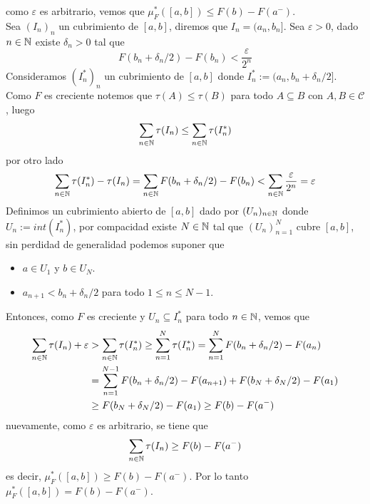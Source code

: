 \documentclass{article}
\begin{document}
\begin{enumerate}
    como $\varepsilon$ es arbitrario, vemos que $\mu_{F}^{*}([a,b])\leq F(b)-F(a^{-})$. 
    \vspace{2mm}\\
    Sea $(I_{n})_{n}$ un cubrimiento de $[a,b]$, diremos que $I_{n}=(a_{n},b_{n}]$. Sea 
    $\varepsilon>0$, dado $n\in\mathbb{N}$ existe $\delta_{n}>0$ tal que
    \begin{equation*}
        F(b_{n}+\delta_{n}/2)-F(b_{n})<\frac{\varepsilon}{2^{n}}
    \end{equation*}
    Consideramos $(I_{n}^{*})_{n}$ un cubrimiento de $[a,b]$ donde $I_{n}^{*}:=
    (a_{n},b_{n}+\delta_{n}/2]$. Como $F$ es creciente notemos que $\tau(A)\leq\tau(B)$ para todo 
    $A\subseteq B$ con $A,B\in\mathcal{C}$, luego
    \begin{equation*}
        \sum_{n\in\mathbb{N}}\tau(I_{n})\leq\sum_{n\in\mathbb{N}}\tau(I_{n}^{*})
    \end{equation*}
    por otro lado
    \begin{equation*}
        \sum_{n\in\mathbb{N}}\tau(I_{n}^{*})-\tau(I_{n})=\sum_{n\in\mathbb{N}}F(b_{n}+{\delta_{n}/2})
        -F(b_{n})<\sum_{n\in\mathbb{N}}\frac{\varepsilon}{2^{n}}=\varepsilon
    \end{equation*}
    Definimos un cubrimiento abierto de $[a,b]$ dado por $(U_{n})_{n\in\mathbb{N}}$ donde 
    $U_{n}:=int(I_{n}^{*})$, por compacidad existe $N\in\mathbb{N}$ tal que $(U_{n})_{n=1}^{N}$ cubre 
    $[a,b]$, sin perdidad de generalidad podemos suponer que
    \begin{itemize}
        \item $a\in U_{1}$ y $b\in U_{N}$.
        \item $a_{n+1}<b_{n}+\delta_{n}/2$ para todo $1\leq n\leq N-1$.
    \end{itemize}
    Entonces, como $F$ es creciente y $U_{n}\subseteq I_{n}^{*}$ para todo $n\in\mathbb{N}$, vemos que
    \begin{align*}
        \sum_{n\in\mathbb{N}}\tau(I_{n})+\varepsilon &> \sum_{n\in\mathbb{N}}\tau(I_{n}^{*})\geq
        \sum_{n=1}^{N}\tau(I_{n}^{*})=\sum_{n=1}^{N}F(b_{n}+\delta_{n}/2)-F(a_{n}) \\
        &= \sum_{n=1}^{N-1}F(b_{n}+\delta_{n}/2)-F(a_{n+1})+F(b_{N}+\delta_{N}/2)-F(a_{1}) \\
        &\geq F(b_{N}+\delta_{N}/2)-F(a_{1})\geq F(b)-F(a^{-})
    \end{align*}
    nuevamente, como $\varepsilon$ es arbitrario, se tiene que
    \begin{equation*}
        \sum_{n\in\mathbb{N}}\tau(I_{n})\geq F(b)-F(a^{-})
    \end{equation*}
    es decir, $\mu_{F}^{*}([a,b])\geq F(b)-F(a^{-})$. Por lo tanto $\mu_{F}^{*}([a,b])=
    F(b)-F(a^{-})$.
    

\end{enumerate}
\end{document}
